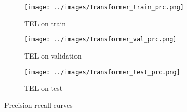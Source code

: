 \documentclass[utf8x]{ctexart}
\begin{document}
\begin{figure}[htb]
  \begin{subfigure}[b]{0.32\textwidth}
    \centering
    \texttt{[image: ../images/Transformer\_train\_prc.png]}
    \caption{TEL on train}
    \label{fig:Transformer_prc_train}
  \end{subfigure}
  \begin{subfigure}[b]{0.32\textwidth}
    \centering
    \texttt{[image: ../images/Transformer\_val\_prc.png]}
    \caption{TEL on validation}
    \label{fig:Transformer_prc_val}
  \end{subfigure}
  \begin{subfigure}[b]{0.32\textwidth}
    \centering
    \texttt{[image: ../images/Transformer\_test\_prc.png]}
    \caption{TEL on test}
    \label{fig:Transformer_prc_test}
  \end{subfigure}

  \caption{Precision recall curves}
  \label{fig:prc}
\end{figure}
\end{document}
